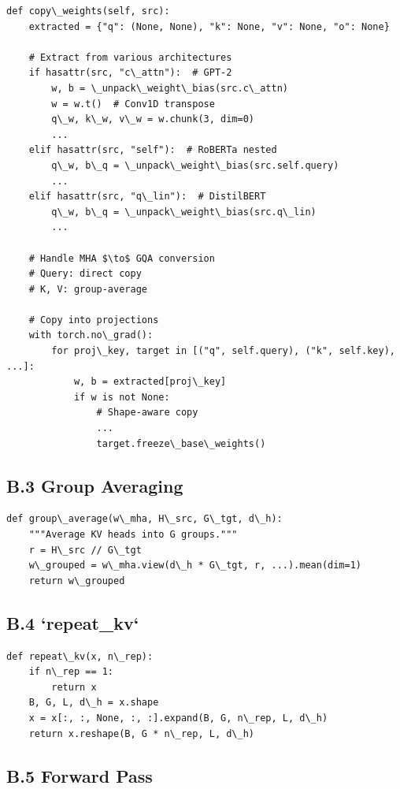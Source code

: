 \begin{lstlisting}
def copy\_weights(self, src):
    extracted = {"q": (None, None), "k": None, "v": None, "o": None}
    
    # Extract from various architectures
    if hasattr(src, "c\_attn"):  # GPT-2
        w, b = \_unpack\_weight\_bias(src.c\_attn)
        w = w.t()  # Conv1D transpose
        q\_w, k\_w, v\_w = w.chunk(3, dim=0)
        ...
    elif hasattr(src, "self"):  # RoBERTa nested
        q\_w, b\_q = \_unpack\_weight\_bias(src.self.query)
        ...
    elif hasattr(src, "q\_lin"):  # DistilBERT
        q\_w, b\_q = \_unpack\_weight\_bias(src.q\_lin)
        ...
    
    # Handle MHA $\to$ GQA conversion
    # Query: direct copy
    # K, V: group-average
    
    # Copy into projections
    with torch.no\_grad():
        for proj\_key, target in [("q", self.query), ("k", self.key), ...]:
            w, b = extracted[proj\_key]
            if w is not None:
                # Shape-aware copy
                ...
                target.freeze\_base\_weights()
\end{lstlisting}

\subsection{B.3 Group Averaging}

\begin{lstlisting}
def group\_average(w\_mha, H\_src, G\_tgt, d\_h):
    """Average KV heads into G groups."""
    r = H\_src // G\_tgt
    w\_grouped = w\_mha.view(d\_h * G\_tgt, r, ...).mean(dim=1)
    return w\_grouped
\end{lstlisting}

\subsection{B.4 `repeat\_kv`}

\begin{lstlisting}
def repeat\_kv(x, n\_rep):
    if n\_rep == 1:
        return x
    B, G, L, d\_h = x.shape
    x = x[:, :, None, :, :].expand(B, G, n\_rep, L, d\_h)
    return x.reshape(B, G * n\_rep, L, d\_h)
\end{lstlisting}

\subsection{B.5 Forward Pass}

